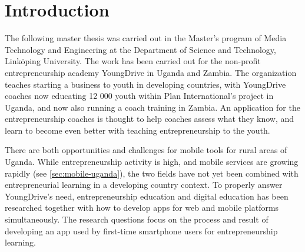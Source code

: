 \chapter{Introduction}\label{cha:intro}



The following master thesis was carried out in the Master's program of Media Technology and Engineering at the Department of Science and Technology, Linköping University. The work has been carried out for the non-profit entrepreneurship academy YoungDrive in Uganda and Zambia. The organization teaches starting a business to youth in developing countries, with YoungDrive coaches now educating 12 000 youth within Plan International's project in Uganda, and now also running a coach training in Zambia. An application for the entrepreneurship coaches is thought to help coaches assess what they know, and learn to become even better with teaching entrepreneurship to the youth.

There are both opportunities and challenges for mobile tools for rural areas of Uganda. While entrepreneurship activity is high, and mobile services are growing rapidly (see \ref{sec:mobile-uganda}), the two fields have not yet been combined with entrepreneurial learning in a developing country context. To properly answer YoungDrive's need, entrepreneurship education and digital education has been researched together with how to develop apps for web and mobile platforms simultaneously. The research questions focus on the process and result of developing an app used by first-time smartphone users for entrepreneurship learning.



% 

%





%

%

%

